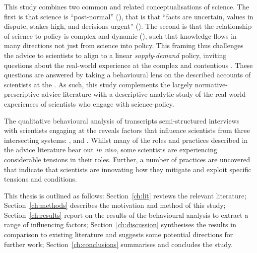 This study combines two common and related conceptualisations of \CAN{} science. The first is that \CAN{} science is ``post-normal'' (\cite{FuntowiczR1993,Gluckman2014}), that is that ``facts are uncertain, values in dispute, stakes high, and decisions urgent'' (\cite[p649]{Ravetz1999}). The second is that the relationship of \CAN{} science to \CAN{} policy is complex and dynamic (\cite{StrassheimK2014,BoswellS2017}), such that knowledge flows in many directions not just from science into policy. This framing thus challenges the advice to scientists to align to a linear \emph{supply}-\emph{demand} policy, inviting questions about the real-world experience at the complex and contentious \CAN{} \SPI. These questions are answered by taking a behavioural lens on the described accounts of scientists at the \CAN{} \SPI. As such, this study complements the largely normative-prescriptive advice literature with a descriptive-analytic study of the real-world experiences of scientists who engage with \CAN{} science-policy.

The qualitative behavioural analysis of transcripts semi-structured interviews with scientists engaging at the \CAN{} \SPI{} reveals factors that influence scientists from three intersecting systems: \inte, \know{} and \scip. Whilst many of the roles and practices described in the advice literature bear out \emph{in vivo}, some scientists are experiencing considerable tensions in their roles. Further, a number of practices are uncovered that indicate that scientists are innovating how they mitigate and exploit specific tensions and conditions. 

This thesis is outlined as follows: Section~\ref{ch:lit} reviews the relevant literature; Section~\ref{ch:methods} describes the motivation and method of this study; Section~\ref{ch:results} report on the results of the behavioural analysis to extract a range of influencing factors; Section~\ref{ch:discussion} synthesises the results in comparison to existing literature and suggests some potential directions for further work; Section~\ref{ch:conclusions} summarises and concludes the study.

